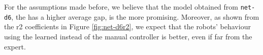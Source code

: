 For the assumptions made before, we believe that the model obtained from  
\texttt{net-d6}, the has a higher average gap, is the more promising. 
Moreover, as shown from the \gls{r2} coefficients in Figure \ref{fig:net-d6r2}, we 
expect that the robots’ behaviour using the learned instead of the manual 
controller is better, even if far from the expert.


%			
%			
%			

